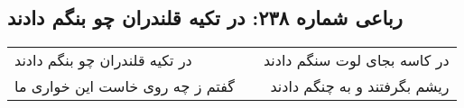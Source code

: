 \begin{center}
\section*{رباعی شماره ۲۳۸: در تکیه قلندران چو بنگم دادند}
\label{sec:sh238}
\begin{longtable}{l p{0.5cm} r}
در تکیه قلندران چو بنگم دادند
&&
در کاسه بجای لوت سنگم دادند
\\
گفتم ز چه روی خاست این خواری ما
&&
ریشم بگرفتند و به چنگم دادند
\\
\end{longtable}
\end{center}
